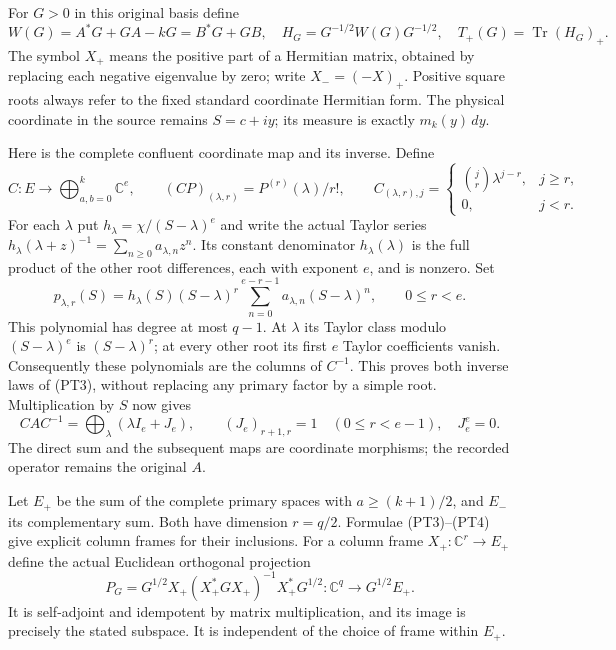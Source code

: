 \documentclass[11pt]{article}
\newcommand{\C}{\mathbb C}
\DeclareMathOperator{\Tr}{Tr}
\begin{document}
For \(G>0\) in this original basis define
\begin{equation}\tag{PT2}
 W(G)=A^*G+GA-kG=B^*G+GB,\quad
 H_G=G^{-1/2}W(G)G^{-1/2},\quad
 T_+(G)=\Tr(H_G)_+.
\end{equation}
The symbol \(X_+\) means the positive part of a Hermitian matrix,
obtained by replacing each negative eigenvalue by zero; write
\(X_-=(-X)_+\). Positive square roots always refer to the fixed
standard coordinate Hermitian form. The physical coordinate in the
source remains \(S=c+iy\); its measure is exactly \(m_k(y)\,dy\).

Here is the complete confluent coordinate map and its inverse. Define
\begin{equation}\tag{PT3}
 C:E\longrightarrow\bigoplus_{a,b=0}^k\C^e,\qquad
 (CP)_{(\lambda,r)}=P^{(r)}(\lambda)/r!,\qquad
 C_{(\lambda,r),j}=\begin{cases}\binom jr\lambda^{j-r},&j\ge r,\\0,&j<r.
 \end{cases}
\end{equation}
For each \(\lambda\) put \(h_\lambda=\chi/(S-\lambda)^e\) and
write the actual Taylor series
\(h_\lambda(\lambda+z)^{-1}=\sum_{n\ge0}a_{\lambda,n}z^n\).
Its constant denominator \(h_\lambda(\lambda)\) is the full product
of the other root differences, each with exponent \(e\), and is
nonzero. Set
\begin{equation}\tag{PT4}
 p_{\lambda,r}(S)=h_\lambda(S)(S-\lambda)^r
       \sum_{n=0}^{e-r-1}a_{\lambda,n}(S-\lambda)^n,
 \qquad0\le r<e.
\end{equation}
This polynomial has degree at most \(q-1\). At \(\lambda\) its
Taylor class modulo \((S-\lambda)^e\) is \((S-\lambda)^r\);
at every other root its first \(e\) Taylor coefficients vanish.
Consequently these polynomials are the columns of \(C^{-1}\).
This proves both inverse laws of (PT3), without replacing any primary
factor by a simple root. Multiplication by \(S\) now gives
\begin{equation}\tag{PT5}
 CAC^{-1}=\bigoplus_\lambda(\lambda I_e+J_e),\qquad
 (J_e)_{r+1,r}=1\quad(0\le r<e-1),\quad J_e^e=0.
\end{equation}
The direct sum and the subsequent maps are coordinate morphisms;
the recorded operator remains the original \(A\).

Let \(E_+\) be the sum of the complete primary spaces with
\(a\ge(k+1)/2\), and \(E_-\) its complementary sum. Both have
dimension \(r=q/2\). Formulae (PT3)--(PT4) give explicit column
frames for their inclusions. For a column frame \(X_+:\C^r\to E_+\)
define the actual Euclidean orthogonal projection
\begin{equation}\tag{PT6}
 P_G=G^{1/2}X_+(X_+^*GX_+)^{-1}X_+^*G^{1/2}
       :\C^q\longrightarrow G^{1/2}E_+.
\end{equation}
It is self-adjoint and idempotent by matrix multiplication, and its
image is precisely the stated subspace. It is independent of the
choice of frame within \(E_+\).
\end{document}
